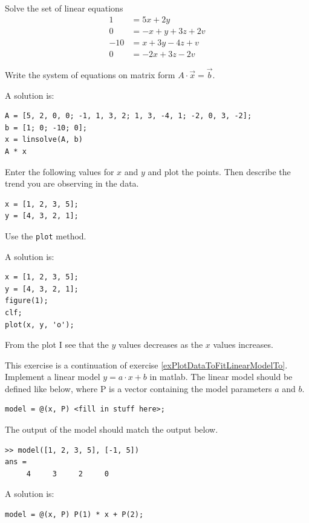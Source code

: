\begin{ex}
Solve the set of linear equations
\begin{align*}
1	& = 5x + 2y	\\
0	& = -x + y + 3z + 2v	\\
-10 	& = x + 3y - 4z + v	\\
0	& = -2x + 3z - 2v 
\end{align*}
\begin{hint}
Write the system of equations on matrix form $A \cdot \vec{x} = \vec{b}$.
\end{hint}
\begin{sol}
A solution is:
\begin{verbatim}
A = [5, 2, 0, 0; -1, 1, 3, 2; 1, 3, -4, 1; -2, 0, 3, -2];
b = [1; 0; -10; 0];
x = linsolve(A, b)
A * x
\end{verbatim}
\end{sol}
\end{ex}



\begin{ex}
Enter\label{exPlotDataToFitLinearModelTo}
the following values for $x$ and $y$ and plot the points.
Then describe the trend you are observing in the data.
\begin{verbatim}
x = [1, 2, 3, 5];
y = [4, 3, 2, 1];
\end{verbatim}
\begin{hint}
Use the \verb!plot! method.
\end{hint}
\begin{sol}
A solution is:
\begin{verbatim}
x = [1, 2, 3, 5];
y = [4, 3, 2, 1];
figure(1);
clf;
plot(x, y, 'o');
\end{verbatim}
From the plot I see that the $y$ values decreases as the $x$ values increases.
\end{sol}
\end{ex}

\begin{ex}
This\label{exPlotDataToFitLinearModelTo2}
exercise is a continuation of exercise \ref{exPlotDataToFitLinearModelTo}.\\
Implement a linear model $y = a \cdot x + b$ in matlab. 
The linear model should be defined like below, where P is a vector containing the 
model parameters $a$ and $b$.
\begin{verbatim}
model = @(x, P) <fill in stuff here>;
\end{verbatim}
\begin{hint}
The output of the model should match the output below.
\begin{verbatim}
>> model([1, 2, 3, 5], [-1, 5])
ans =
     4     3     2     0
\end{verbatim}
\end{hint}
\begin{sol}
A solution is:
\begin{verbatim}
model = @(x, P) P(1) * x + P(2);
\end{verbatim}
\end{sol}
\end{ex}


